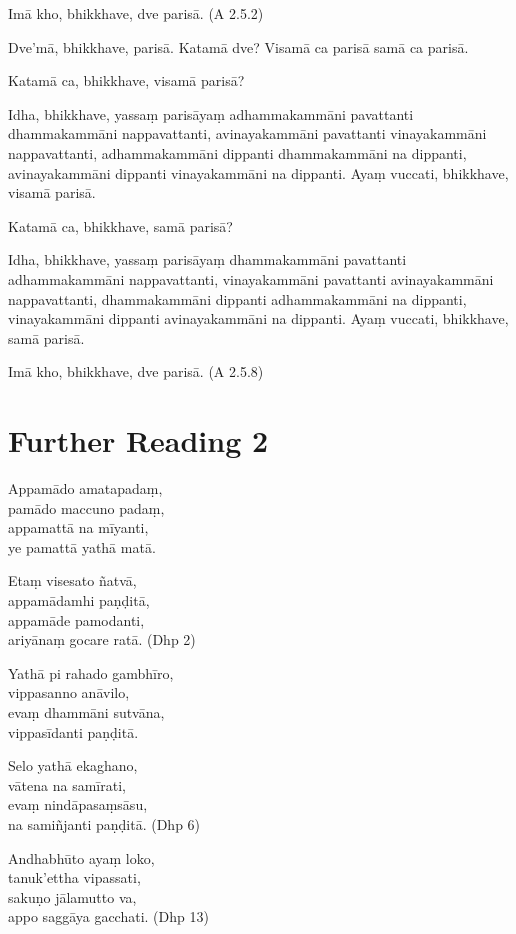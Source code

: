 Imā kho, bhikkhave, dve parisā. (A 2.5.2)

Dve’mā, bhikkhave, parisā. Katamā dve? Visamā ca parisā samā ca parisā.

Katamā ca, bhikkhave, visamā parisā?

Idha, bhikkhave, yassaṃ parisāyaṃ adhammakammāni pavattanti dhammakammāni nappavattanti, avinayakammāni pavattanti vinayakammāni nappavattanti, adhammakammāni dippanti dhammakammāni na dippanti, avinayakammāni dippanti vinayakammāni na dippanti. Ayaṃ vuccati, bhikkhave, visamā parisā.

Katamā ca, bhikkhave, samā parisā?

Idha, bhikkhave, yassaṃ parisāyaṃ dhammakammāni pavattanti adhammakammāni nappavattanti, vinayakammāni pavattanti avinayakammāni nappavattanti, dhammakammāni dippanti adhammakammāni na dippanti, vinayakammāni dippanti avinayakammāni na dippanti. Ayaṃ vuccati, bhikkhave, samā parisā.

Imā kho, bhikkhave, dve parisā. (A 2.5.8)

\section*{Further Reading 2}

Appamādo amatapadaṃ,\\
pamādo maccuno padaṃ,\\
appamattā na mīyanti,\\
ye pamattā yathā matā.

Etaṃ visesato ñatvā,\\
appamādamhi paṇḍitā,\\
appamāde pamodanti,\\
ariyānaṃ gocare ratā. (Dhp 2)

Yathā pi rahado gambhīro,\\
vippasanno anāvilo,\\
evaṃ dhammāni sutvāna,\\
vippasīdanti paṇḍitā.

Selo yathā ekaghano,\\
vātena na samīrati,\\
evaṃ nindāpasaṃsāsu,\\
na samiñjanti paṇḍitā. (Dhp 6)

Andhabhūto ayaṃ loko,\\
tanuk’ettha vipassati,\\
sakuṇo jālamutto va,\\
appo saggāya gacchati. (Dhp 13)

